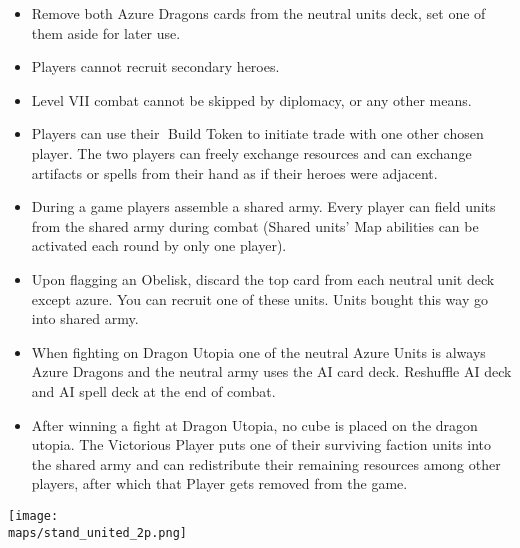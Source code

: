 \begin{multicols}{2}
\begin{itemize}
  \item Remove both Azure Dragons cards from the neutral units deck, set one of them aside for later use.
  \item Players cannot recruit secondary heroes.
  \item Level VII combat cannot be skipped by diplomacy, or any other means.
  \item Players can use their 🔨Build Token to initiate trade with one other chosen player. The two players can freely exchange resources and can exchange artifacts or spells from their hand as if their heroes were adjacent.
  \item During a game players assemble a shared army. Every player can field units from the shared army during combat (Shared units'  Map abilities can be activated each round by only one player).
  \item Upon flagging an Obelisk, discard the top card from each neutral unit deck except azure. You can recruit one of these units. Units bought this way go into shared army.
  \item When fighting on Dragon Utopia one of the neutral Azure Units is always Azure Dragons and the neutral army uses the AI card deck. Reshuffle AI deck and AI spell deck at the end of combat.
  \item After winning a fight at Dragon Utopia, no cube is placed on the dragon utopia. The Victorious Player puts one of their surviving faction units into the shared army and can redistribute their remaining resources among other players, after which that Player gets removed from the game.
\end{itemize}

\columnbreak

\begin{center}
  \texttt{[image: \\maps/stand\_united\_2p.png]}
\end{center}

\vspace*{\fill}

\end{multicols}


